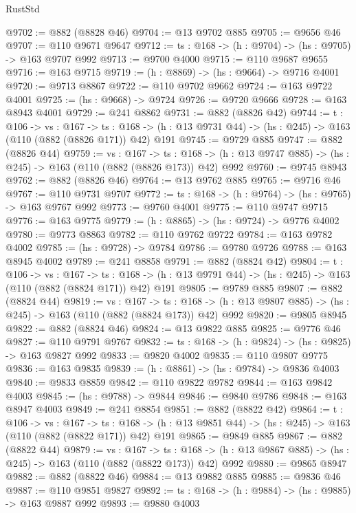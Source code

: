\begin{lexlean}{RustStd}
\begin{coremodule}
@9702 := @882 (@8828 @46)
@9704 := @13 @9702 @885
@9705 := @9656 @46
@9707 := @110 @9671 @9647
@9712 := {ts : @168} -> (h : @9704) -> (hs : @9705) -> @163 @9707 @992
@9713 := @9700 @4000
@9715 := @110 @9687 @9655
@9716 := @163 @9715
@9719 := (h : @8869) -> (hs : @9664) -> @9716 @4001
@9720 := @9713 @8867
@9722 := @110 @9702 @9662
@9724 := @163 @9722 @4001
@9725 := (hs : @9668) -> @9724
@9726 := @9720 @9666
@9728 := @163 @8943 @4001
@9729 := @241 @8862
@9731 := @882 (@8826 @42)
@9744 := {t : @106} ->
  {vs : @167} ->
  {ts : @168} -> (h : @13 @9731 @44) -> (hs : @245) -> @163 (@110 (@882 (@8826 @171)) @42) @191
@9745 := @9729 @885
@9747 := @882 (@8826 @44)
@9759 := {vs : @167} ->
  {ts : @168} -> (h : @13 @9747 @885) -> (hs : @245) -> @163 (@110 (@882 (@8826 @173)) @42) @992
@9760 := @9745 @8943
@9762 := @882 (@8826 @46)
@9764 := @13 @9762 @885
@9765 := @9716 @46
@9767 := @110 @9731 @9707
@9772 := {ts : @168} -> (h : @9764) -> (hs : @9765) -> @163 @9767 @992
@9773 := @9760 @4001
@9775 := @110 @9747 @9715
@9776 := @163 @9775
@9779 := (h : @8865) -> (hs : @9724) -> @9776 @4002
@9780 := @9773 @8863
@9782 := @110 @9762 @9722
@9784 := @163 @9782 @4002
@9785 := (hs : @9728) -> @9784
@9786 := @9780 @9726
@9788 := @163 @8945 @4002
@9789 := @241 @8858
@9791 := @882 (@8824 @42)
@9804 := {t : @106} ->
  {vs : @167} ->
  {ts : @168} -> (h : @13 @9791 @44) -> (hs : @245) -> @163 (@110 (@882 (@8824 @171)) @42) @191
@9805 := @9789 @885
@9807 := @882 (@8824 @44)
@9819 := {vs : @167} ->
  {ts : @168} -> (h : @13 @9807 @885) -> (hs : @245) -> @163 (@110 (@882 (@8824 @173)) @42) @992
@9820 := @9805 @8945
@9822 := @882 (@8824 @46)
@9824 := @13 @9822 @885
@9825 := @9776 @46
@9827 := @110 @9791 @9767
@9832 := {ts : @168} -> (h : @9824) -> (hs : @9825) -> @163 @9827 @992
@9833 := @9820 @4002
@9835 := @110 @9807 @9775
@9836 := @163 @9835
@9839 := (h : @8861) -> (hs : @9784) -> @9836 @4003
@9840 := @9833 @8859
@9842 := @110 @9822 @9782
@9844 := @163 @9842 @4003
@9845 := (hs : @9788) -> @9844
@9846 := @9840 @9786
@9848 := @163 @8947 @4003
@9849 := @241 @8854
@9851 := @882 (@8822 @42)
@9864 := {t : @106} ->
  {vs : @167} ->
  {ts : @168} -> (h : @13 @9851 @44) -> (hs : @245) -> @163 (@110 (@882 (@8822 @171)) @42) @191
@9865 := @9849 @885
@9867 := @882 (@8822 @44)
@9879 := {vs : @167} ->
  {ts : @168} -> (h : @13 @9867 @885) -> (hs : @245) -> @163 (@110 (@882 (@8822 @173)) @42) @992
@9880 := @9865 @8947
@9882 := @882 (@8822 @46)
@9884 := @13 @9882 @885
@9885 := @9836 @46
@9887 := @110 @9851 @9827
@9892 := {ts : @168} -> (h : @9884) -> (hs : @9885) -> @163 @9887 @992
@9893 := @9880 @4003

\end{coremodule}
\end{lexlean}
